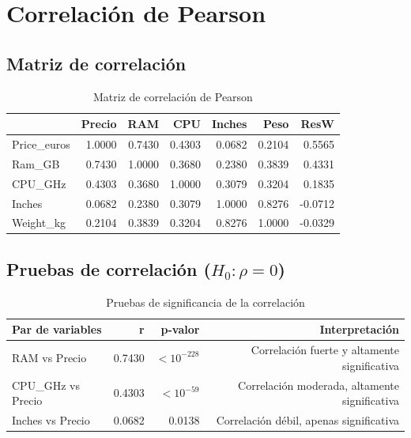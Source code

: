 \documentclass[12pt,a4paper]{article}
\begin{document}
\section{Correlación de Pearson}

\subsection{Matriz de correlación}

\begin{table}[H]
\centering
\caption{Matriz de correlación de Pearson}
\begin{tabular}{lrrrrrr}
\toprule
 & \textbf{Precio} & \textbf{RAM} & \textbf{CPU} & \textbf{Inches} & \textbf{Peso} & \textbf{ResW} \\
\midrule
Price\_euros & 1.0000 & 0.7430 & 0.4303 & 0.0682 & 0.2104 & 0.5565 \\
Ram\_GB & 0.7430 & 1.0000 & 0.3680 & 0.2380 & 0.3839 & 0.4331 \\
CPU\_GHz & 0.4303 & 0.3680 & 1.0000 & 0.3079 & 0.3204 & 0.1835 \\
Inches & 0.0682 & 0.2380 & 0.3079 & 1.0000 & 0.8276 & -0.0712 \\
Weight\_kg & 0.2104 & 0.3839 & 0.3204 & 0.8276 & 1.0000 & -0.0329 \\
\bottomrule
\end{tabular}
\end{table}

\subsection{Pruebas de correlación ($H_0: \rho = 0$)}

\begin{table}[H]
\centering
\caption{Pruebas de significancia de la correlación}
\begin{tabular}{lrrr}
\toprule
\textbf{Par de variables} & \textbf{r} & \textbf{p-valor} & \textbf{Interpretación} \\
\midrule
RAM vs Precio & 0.7430 & $<10^{-228}$ & Correlación fuerte y altamente significativa \\
CPU\_GHz vs Precio & 0.4303 & $<10^{-59}$ & Correlación moderada, altamente significativa \\
Inches vs Precio & 0.0682 & 0.0138 & Correlación débil, apenas significativa \\
\bottomrule
\end{tabular}
\end{table}
\end{document}
